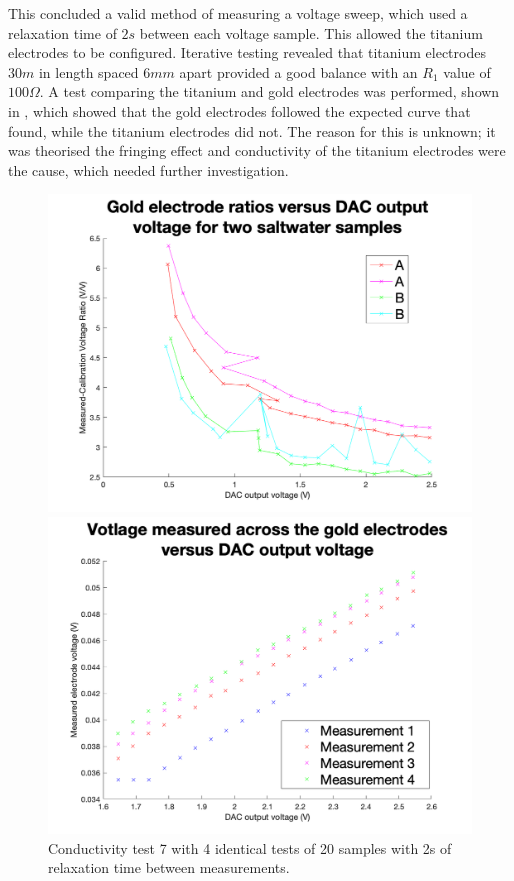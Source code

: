 This concluded a valid method of measuring a voltage sweep, which used a relaxation time of $2s$ between each voltage sample.
This allowed the titanium electrodes to be configured.
Iterative testing revealed that titanium electrodes $30m$ in length spaced $6mm$ apart provided a good balance with an $R_1$ value of $100\Omega$.
A test comparing the titanium and gold electrodes was performed, shown in , which showed that the gold electrodes followed the expected curve that  found, while the titanium electrodes did not.
The reason for this is unknown; it was theorised the fringing effect and conductivity of the titanium electrodes were the cause, which needed further investigation.



\begin{figure}[ht]
    \begin{minipage}{0.5\textwidth}
        \centering
        \includegraphics[width=\textwidth]{Figures/Testing/Aus12}
        \caption{Conductivity test 7 with 4 identical tests of 20 samples with 2s of relaxation time between measurements.}
        \label{fig:test7} %
    \end{minipage}
    \begin{minipage}{0.5\textwidth}
        \centering
        \includegraphics[width=\textwidth]{Figures/Testing/Aus10}

\end{minipage}
\end{figure}
